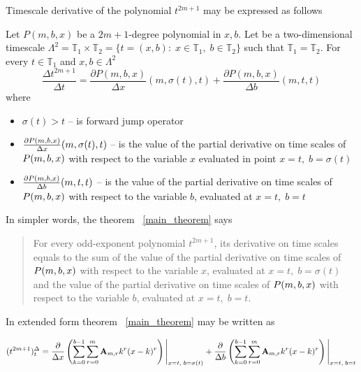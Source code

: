 Timescale derivative of the polynomial $t^{2m+1}$ may be expressed as follows
\begin{thm}
    \label{main_theorem}
    Let $P(m,b,x)$ be a $2m+1$-degree polynomial in $x,b$.
    Let be a two-dimensional timescale
    $\Lambda^2 = \mathbb{T}_1 \times \mathbb{T}_2 = \{t=(x, b) \colon \; x\in\mathbb{T}_1, \; b\in\mathbb{T}_2 \}$
    such that $\mathbb{T}_1 = \mathbb{T}_2$.
    For every $t\in\mathbb{T}_1$ and $x,b\in \Lambda^2$
    \[
        \frac{\Delta t^{2m+1}}{\Delta t} =
        \frac{\partial P(m,b,x)}{\Delta x} (m, \sigma(t), t) +
        \frac{\partial P(m,b,x)}{\Delta b} (m, t, t)
    \]
    where
    \begin{itemize}
        \setlength\itemsep{1em}
        \item  $\sigma(t) > t$ -- is forward jump operator

        \item $\frac{\partial P ( m, b, x )}{\Delta x} (m, \sigma(t), t)$ --
        is the value of the partial derivative on time scales of
        $P ( m, b, x )$ with respect to the variable $x$ evaluated in point $x = t, \; b = \sigma(t)$

        \item $\frac{\partial P ( m, b, x )}{\Delta b} (m, t, t)$ --
        is the value of the partial derivative on time scales of
        $P ( m, b, x )$ with respect to the variable $b$, evaluated at $x = t, \; b = t$
    \end{itemize}
\end{thm}
In simpler words, the theorem ~\ref{main_theorem} says
\begin{center}
    \begin{quotation}
        For every odd-exponent polynomial $t^{2m+1}$, its derivative on time scales equals to the sum
        of the value of the partial derivative on time scales of
        $P ( m, b, x )$
        with respect to the variable
        $x$,
        evaluated at
        $x = t, \; b = \sigma(t)$
        and the value of the partial derivative on time scales of
        $P ( m, b, x )$
        with respect to the variable
        $b$,
        evaluated at
        $x = t, \; b = t$.
    \end{quotation}
\end{center}

In extended form theorem ~\ref{main_theorem} may be written as

\begin{align*}
(t^{2m+1})
    ^{\Delta}_{t} =
    \frac{\partial}{\Delta x} \left( \sum_{k=0}^{b-1} \sum_{r=0}^{m} {\mathbf{A}} \sb{m,r} k^r(x-k)^r \right) \Bigg |_{x = t, \; b = \sigma(t)}
    + \frac{\partial}{\Delta b} \left( \sum_{k=0}^{b-1} \sum_{r=0}^{m} {\mathbf{A}} \sb{m,r} k^r(x-k)^r \right) \Bigg |_{x = t, \; b = t}
\end{align*}

